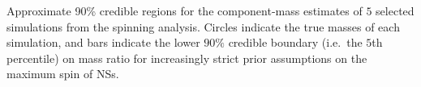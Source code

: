 \label{fig:comp_masses} Approximate 90\% credible regions for the component-mass estimates of $5$ selected simulations from the spinning analysis.  Circles indicate the true masses of each simulation, and bars indicate the lower $90\%$ credible boundary (i.e.\ the $5$th percentile) on mass ratio for increasingly strict prior assumptions on the maximum spin of NSs.
  
  
  
  